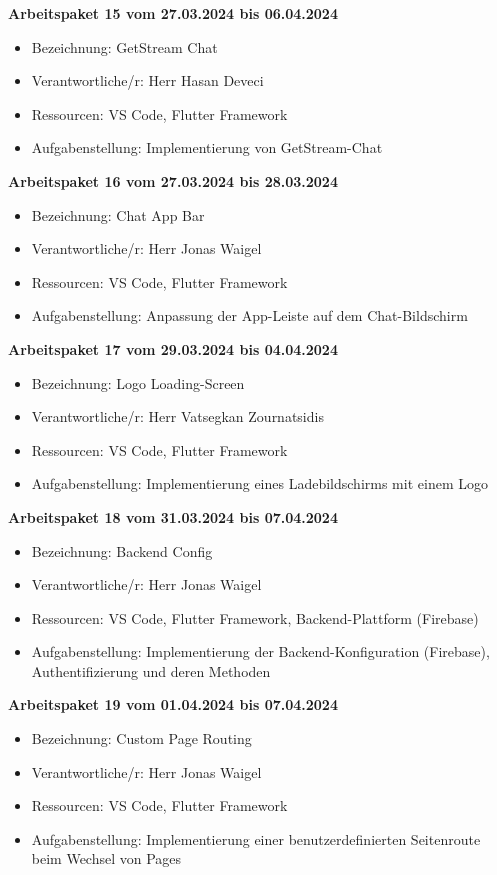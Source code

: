 \textbf{Arbeitspaket 15 vom 27.03.2024 bis 06.04.2024}
\begin{itemize}[itemsep=0pt]
    \item{Bezeichnung: GetStream Chat} 
	\item{Verantwortliche/r: Herr Hasan Deveci} 
	\item{Ressourcen: VS Code, Flutter Framework} 
    \item{Aufgabenstellung: Implementierung von GetStream-Chat}
\end{itemize}

\textbf{Arbeitspaket 16 vom 27.03.2024 bis 28.03.2024}
\begin{itemize}[itemsep=0pt]
    \item{Bezeichnung: Chat App Bar}
	\item{Verantwortliche/r: Herr Jonas Waigel} 
	\item{Ressourcen: VS Code, Flutter Framework} 
    \item{Aufgabenstellung: Anpassung der App-Leiste auf dem Chat-Bildschirm}
\end{itemize} 

\newpage
\textbf{Arbeitspaket 17 vom 29.03.2024 bis 04.04.2024}
\begin{itemize}[itemsep=0pt]
    \item{Bezeichnung: Logo Loading-Screen} 
	\item{Verantwortliche/r: Herr Vatsegkan Zournatsidis} 
	\item{Ressourcen: VS Code, Flutter Framework} 
    \item{Aufgabenstellung: Implementierung eines Ladebildschirms mit einem Logo}
\end{itemize}

\textbf{Arbeitspaket 18 vom 31.03.2024 bis 07.04.2024}
\begin{itemize}[itemsep=0pt]
    \item{Bezeichnung: Backend Config} 
	\item{Verantwortliche/r: Herr Jonas Waigel} 
	\item{Ressourcen: VS Code, Flutter Framework, Backend-Plattform (Firebase)}
    \item{Aufgabenstellung: Implementierung der Backend-Konfiguration (Firebase), Authentifizierung und deren Methoden} 
\end{itemize}

\textbf{Arbeitspaket 19 vom 01.04.2024 bis 07.04.2024}
\begin{itemize}[itemsep=0pt]
    \item{Bezeichnung: Custom Page Routing} 
	\item{Verantwortliche/r: Herr Jonas Waigel} 
	\item{Ressourcen: VS Code, Flutter Framework} 
    \item{Aufgabenstellung: Implementierung einer benutzerdefinierten Seitenroute beim Wechsel von Pages}
\end{itemize} 

